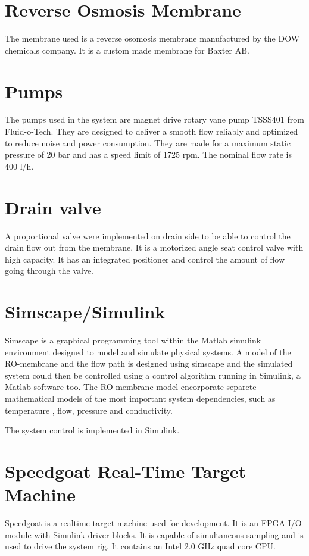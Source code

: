 
\section{Reverse Osmosis Membrane}
The membrane used is a reverse osomosis membrane manufactured by the DOW chemicals company. It is a custom made membrane for Baxter AB. 

\section{Pumps}
The pumps used in the system are magnet drive rotary vane pump TSSS401 from Fluid-o-Tech. They are designed to deliver a smooth flow reliably and optimized to reduce noise and power consumption. They are made for a maximum static pressure of 20 bar and has a speed limit of 1725 rpm. The nominal flow rate is 400 l/h. 

\section{Drain valve}
A proportional valve were implemented on drain side to be able to control the drain flow out from the membrane. It is a motorized angle seat control valve with high capacity. It has an integrated positioner and control the amount of flow going through the valve.

\section{Simscape/Simulink} 
\label{Simscape}

Simscape is a graphical programming tool within the Matlab simulink environment designed to model and simulate physical systems. A model of the RO-membrane and the flow path is designed using simscape and the simulated system could then be controlled using a control algorithm running in Simulink, a Matlab software too. The RO-membrane model encorporate separete mathematical models of the most important system dependencies, such as temperature , flow, pressure and conductivity.  

The system control is implemented in Simulink. 


\section{Speedgoat Real-Time Target Machine}
\label{speedgoat}
Speedgoat is a realtime target machine used for development. It is an FPGA I/O module with Simulink driver blocks. It is capable of simultaneous sampling and is used to drive the system rig. It contains an Intel 2.0 GHz quad core CPU. 

